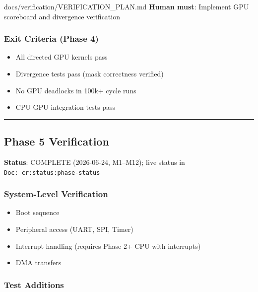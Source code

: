 \begin{relocated}{docs/verification/VERIFICATION_PLAN.md}
\textbf{Human must}: Implement GPU scoreboard and divergence
verification

\subsubsection{Exit Criteria (Phase 4)}\label{ds:ch:verification-plan:exit-criteria-phase-4}

\begin{itemize}
\tightlist
\item
  All directed GPU kernels pass
\item
  Divergence tests pass (mask correctness verified)
\item
  No GPU deadlocks in 100k+ cycle runs
\item
  CPU-GPU integration tests pass
\end{itemize}

\begin{center}\rule{0.5\linewidth}{0.5pt}\end{center}

\subsection{Phase 5 Verification}\label{ds:ch:verification-plan:phase-5-verification}

\textbf{Status}: \ok{} COMPLETE (2026-06-24, M1--M12); live status in
\texttt{Doc:\allowbreak{}\ cr:\allowbreak{}status:\allowbreak{}phase-\allowbreak{}status}

\subsubsection{System-Level Verification}\label{ds:ch:verification-plan:system-level-verification}

\begin{itemize}
\tightlist
\item
  Boot sequence
\item
  Peripheral access (UART, SPI, Timer)
\item
  Interrupt handling (requires Phase 2+ CPU with interrupts)
\item
  DMA transfers
\end{itemize}

\subsubsection{Test Additions}\label{ds:ch:verification-plan:test-additions-2}


\end{relocated}
